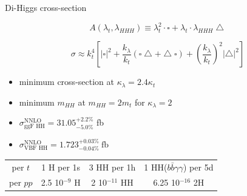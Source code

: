 \begin{frame}{Di-Higgs cross-section}

\begin{equation*}
    A(\lambda_t, \lambda_{HHH}) \equiv \lambda_t^2\cdot\square + \lambda_t\cdot\lambda_{HHH}\bigtriangleup
\end{equation*}

\begin{equation*}
  \sigma \approx k_{t}^{4}\left[|\square|^{2}+\frac{k_{\lambda}}{k_{t}}(\square\bigtriangleup+\bigtriangleup \square)+\left(\frac{k_{\lambda}}{k_{t}}\right)^{2}|\bigtriangleup|^{2}\right]
  \label{eq:chap1:HH:XSEC:Param}
\end{equation*}

\begin{itemize}
    \item minimum cross-section at $\kappa_{\lambda} = 2.4 \kappa_{t}$
    \item minimum $m_{HH}$ at $m_{HH} = 2 m_{t}$ for $\kappa_{\lambda} = 2$
    \item $\sigma_{\text{ggF HH}}^{\text{NNLO}} = 31.05_{-5.0\%}^{+2.2\%}$ fb
    \item $\sigma_{\text{VBF HH}}^{\text{NNLO}} = 1.723_{-0.04\%}^{+0.03\%} \ \text{fb}$
\end{itemize}
\begin{table}[]
    \centering
    \begin{tabular}{cccc}
    \hline\hline
     per $t$ & 1 H per 1s & 3 HH per 1h & 1 HH($b\bar{b}\gamma\gamma$) per 5d  \\
     per $pp$ & 2.5 10$^{-9}$ H & 2 10$^{-11}$ HH &  6.25 10$^{-16}$ 2H \\
    \hline\hline    
    \end{tabular}
\end{table}

\end{frame}

